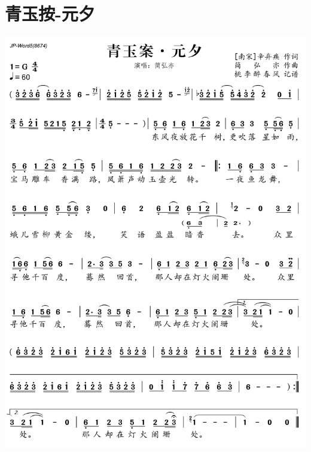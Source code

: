 \documentclass[cn,pad,chinese,chinesefont=nofont]{elegantbook}
\begin{document}
\section{青玉按-元夕}
    \includegraphics[width=\textwidth]{dongxiao/20200323青玉按.png}
\end{document}

